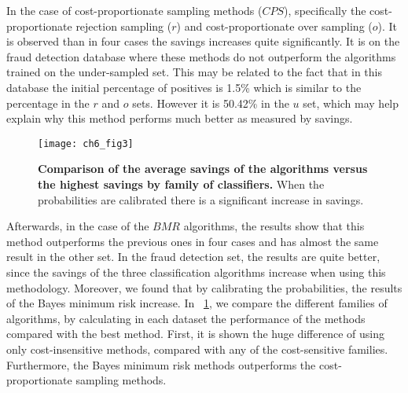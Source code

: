 In the case of cost-proportionate sampling methods ($CPS$), specifically the 
cost-proportionate rejection sampling ($r$) and cost-proportionate over 
sampling ($o$). It is observed than in four cases the savings increases quite 
significantly. It is on the fraud detection database where these methods do not outperform the 
algorithms trained on the under-sampled set. This may be related to the fact that in this 
database the initial percentage of positives is 1.5\% which is similar to the percentage in the 
$r$ and   $o$ sets. However it is 50.42\% in the $u$ set, which may help explain why this method 
performs much better as measured by savings.

\begin{figure}[!t]
  \centering
  \texttt{[image: ch6\_fig3]}
  \caption{\textbf{Comparison of the average savings of the algorithms versus the 
    highest savings by family of classifiers.} When the probabilities are calibrated there is a 
    significant increase in savings.}
  \label{fig:6:comparison_family}
\end{figure}

Afterwards, in the case of the $BMR$ algorithms, the results show that this method outperforms 
the previous ones in four cases and has almost the same result in the other set. In the fraud 
detection  set, the results are quite better, since the savings of the three classification 
algorithms increase when using this methodology. Moreover, we found that by calibrating the 
probabilities, the results of the Bayes minimum risk increase. In 
\figurename{~\ref{fig:6:comparison_family}}, we compare the different families of algorithms, by 
calculating in each dataset the performance of the methods compared with the best method. First, it 
is shown the huge difference of using only cost-insensitive methods, compared with any of the 
cost-sensitive families. Furthermore, the Bayes minimum risk methods outperforms the 
cost-proportionate sampling methods.


